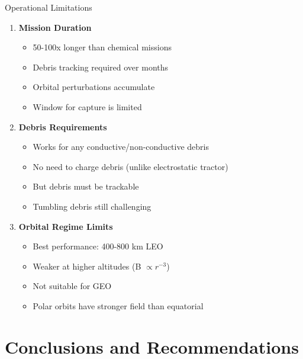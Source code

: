 \documentclass[aspectratio=169]{beamer}
\begin{document}
\begin{frame}{Operational Limitations}
\begin{enumerate}
    \item \textbf{Mission Duration}
    \begin{itemize}
        \item 50-100x longer than chemical missions
        \item Debris tracking required over months
        \item Orbital perturbations accumulate
        \item Window for capture is limited
    \end{itemize}

    \item \textbf{Debris Requirements}
    \begin{itemize}
        \item Works for any conductive/non-conductive debris
        \item No need to charge debris (unlike electrostatic tractor)
        \item But debris must be trackable
        \item Tumbling debris still challenging
    \end{itemize}

    \item \textbf{Orbital Regime Limits}
    \begin{itemize}
        \item Best performance: 400-800 km LEO
        \item Weaker at higher altitudes (B $\propto r^{-3}$)
        \item Not suitable for GEO
        \item Polar orbits have stronger field than equatorial
    \end{itemize}
\end{enumerate}
\end{frame}

\section{Conclusions and Recommendations}
\end{document}
